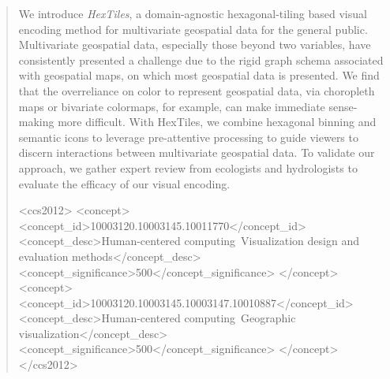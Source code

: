 {\maketitle
\begin{abstract}
    We introduce \textit{HexTiles}, a domain-agnostic hexagonal-tiling based visual encoding method
    for multivariate geospatial data for the general public. Multivariate geospatial data, especially those beyond 
    two variables, have consistently presented a challenge due to the rigid graph schema associated 
    with geospatial maps, on which most geospatial data is presented. We find that the overreliance on color to represent geospatial data, via choropleth maps or bivariate colormaps, for example, can make immediate sense-making more difficult.
    With HexTiles, we combine hexagonal binning
    and semantic icons to leverage pre-attentive processing to guide viewers to discern interactions between multivariate
    geospatial data. To validate our approach, we gather expert review from ecologists and hydrologists to evaluate the efficacy of our visual encoding.
   
\begin{CCSXML}
<ccs2012>
<concept>
<concept_id>10003120.10003145.10011770</concept_id>
<concept_desc>Human-centered computing~Visualization design and evaluation methods</concept_desc>
<concept_significance>500</concept_significance>
</concept>
<concept>
<concept_id>10003120.10003145.10003147.10010887</concept_id>
<concept_desc>Human-centered computing~Geographic visualization</concept_desc>
<concept_significance>500</concept_significance>
</concept>
</ccs2012>
\end{CCSXML}


\end{abstract}}
